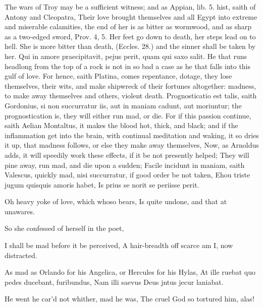 The wars of Troy may be a sufficient witness; and as Appian, lib. 5.
hist, saith of Antony and Cleopatra, Their love brought
themselves and all Egypt into extreme and miserable calamities, the end
of her is as bitter as wormwood, and as sharp as a two-edged sword,
Prov.  4, 5. Her feet go down to death, her steps lead on to hell.
She is more bitter than death, (Eccles.  28.) and the sinner shall
be taken by her. Qui in amore praecipitavit, pejus perit, quam
qui saxo salit. He that runs headlong from the top of a rock is
not in so bad a case as he that falls into this gulf of love. For
hence, saith  Platina, comes repentance, dotage, they lose
themselves, their wits, and make shipwreck of their fortunes
altogether: madness, to make away themselves and others, violent death.
Prognosticatio est talis, saith Gordonius, si non succurratur
iis, aut in maniam cadunt, aut moriuntur; the prognostication is, they
will either run mad, or die. For if this passion continue, saith
Aelian Montaltus, it makes the blood hot, thick, and black; and
if the inflammation get into the brain, with continual meditation and
waking, it so dries it up, that madness follows, or else they make away
themselves,  Now, as
Arnoldus adds, it will speedily work these effects, if it be not
presently helped; They will pine away, run mad, and die upon a
sudden; Facile incidunt in maniam, saith Valescus, quickly mad, nisi
succurratur, if good order be not taken,
Ehou triste jugum quisquis amoris habet,
Is prius se norit se periisse perit.

Oh heavy yoke of love, which whoso bears,
Is quite undone, and that at unawares.

So she confessed of herself in the poet,

I shall be mad before it be perceived,
A hair-breadth off scarce am I, now distracted.

As mad as Orlando for his Angelica, or Hercules for his Hylas,
At ille ruebat quo pedes ducebant, furibundus,
Nam illi saevus Deus jntus jecur laniabat.

He went he car'd not whither, mad he was,
The cruel God so tortured him, alas!

